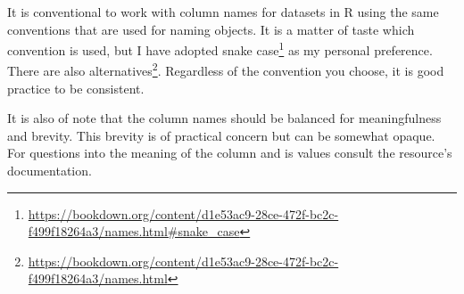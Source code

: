 \documentclass[
  letterpaper,
]{scrbook}
\DeclareRobustCommand{\href}[2]{#2\footnote{\url{#1}}}
\begin{document}
\begin{tcolorbox}[enhanced jigsaw, title=\textcolor{quarto-callout-warning-color}{\faExclamationTriangle}\hspace{0.5em}{Tip}, breakable, colback=white, colframe=quarto-callout-warning-color-frame, bottomrule=.15mm, left=2mm, bottomtitle=1mm, colbacktitle=quarto-callout-warning-color!10!white, opacityback=0, arc=.35mm, toprule=.15mm, coltitle=black, leftrule=.75mm, opacitybacktitle=0.6, toptitle=1mm, titlerule=0mm, rightrule=.15mm]

It is conventional to work with column names for datasets in R using the
same conventions that are used for naming objects. It is a matter of
taste which convention is used, but I have adopted
\href{https://bookdown.org/content/d1e53ac9-28ce-472f-bc2c-f499f18264a3/names.html\#snake_case}{snake
case} as my personal preference. There are also
\href{https://bookdown.org/content/d1e53ac9-28ce-472f-bc2c-f499f18264a3/names.html}{alternatives}.
Regardless of the convention you choose, it is good practice to be
consistent.

It is also of note that the column names should be balanced for
meaningfulness and brevity. This brevity is of practical concern but can
be somewhat opaque. For questions into the meaning of the column and is
values consult the resource's documentation.

\end{tcolorbox}
\end{document}

